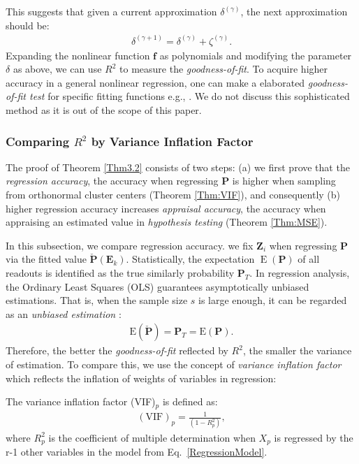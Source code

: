 This suggests that given a current approximation $\delta^{(\gamma)}$, the next approximation should be: 
\begin{align}
	\delta^{(\gamma+1)} = \delta^{(\gamma)} + \zeta^{(\gamma)}.
\end{align}
Expanding the nonlinear function $\bm f$ as polynomials and modifying the parameter $\delta$ as above, we can use $R^2$ to measure the \emph{goodness-of-fit}. To acquire higher accuracy in a general nonlinear regression, one can make a elaborated \emph{goodness-of-fit test} for specific fitting functions e.g., \cite{GeneralPurpose1995,Common1997}. We do not discuss this sophisticated method as it is out of the scope of this paper. 


\subsubsection{Comparing $R^2$ by Variance Inflation Factor}
\label{C2.2}

The proof of Theorem \ref{Thm3.2} consists of two steps: (a) we first prove that the \emph{regression accuracy}, the accuracy when regressing $\bm P$ is higher when sampling from orthonormal cluster centers (Theorem \ref{Thm:VIF}), and consequently (b) higher regression accuracy increases \emph{appraisal accuracy}, the accuracy when appraising an estimated value in \emph{hypothesis testing} (Theorem \ref{Thm:MSE}). 

In this subsection, we compare regression accuracy. we fix $\bm Z_{i}$ when regressing $\bm P$ via the fitted value $\check{\bm P}(\bm E_{k})$. Statistically, the expectation $\operatorname{E}(\bm P)$ of all readouts is identified as the true similarly probability $\bm P_T$. In regression analysis, the Ordinary Least Squares (OLS) guarantees asymptotically unbiased estimations. That is, when the sample size $s$ is large enough, it can be regarded as an \emph{unbiased estimation} \cite{Kutner1985}: 
\begin{align}
	\text{E}(\check{\bm P}) = \bm P_T = \text{E}(\bm P).
\end{align}
Therefore, the better the \emph{goodness-of-fit} reflected by $R^2$, the smaller the variance of estimation. To compare this, we use the concept of \emph{variance inflation factor} which reflects the inflation of weights of variables in regression:
\begin{definition} \label{def:vif}
	The variance inflation factor (VIF)$_p$ is defined as:
	\begin{align}
		(\text{VIF})_p = \frac{1}{(1 - R_p^2)},
	\end{align}
	where $R_p^2$ is the coefficient of multiple determination when $X_p$ is regressed by the r-1 other variables in the model from Eq.~\eqref{RegressionModel}. 
\end{definition}

